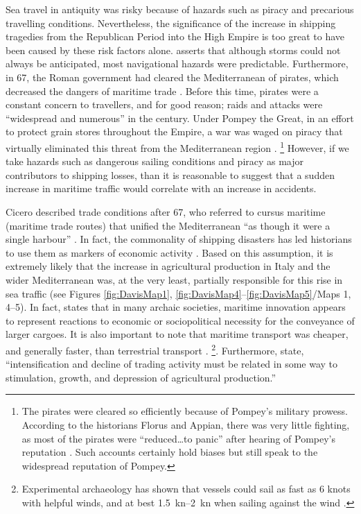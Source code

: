 Sea travel in antiquity was risky because of hazards such as piracy and precarious travelling conditions. 
Nevertheless, the significance of the increase in shipping tragedies from the Republican Period into the High Empire is too great to have been caused by these risk factors alone. \textcite[3304]{Leidwanger_2013} asserts that although storms could not always be anticipated, most navigational hazards were predictable. Furthermore, in 67\BC, the Roman government had cleared the Mediterranean of pirates, which decreased the dangers of maritime trade \parencites[313]{Kessler_2007}[287]{Wilson_2012}. Before this time, pirates were a constant concern to travellers, and for good reason; raids and attacks were “widespread and numerous” in the  century\BC \parencite[165]{Souza_1999}. 
Under Pompey the Great, in an effort to protect grain stores throughout the Empire, a war was waged on piracy that virtually eliminated this threat from the Mediterranean region \parencites[226]{Adams_2012}{Souza_1999}.
\footnote{The pirates were cleared so efficiently because of Pompey’s military prowess. According to the historians Florus and Appian, there was very little fighting, as most of the pirates were “reduced…to panic” after hearing of Pompey’s reputation \parencite[169]{Souza_1999}. 
Such accounts certainly hold biases but still speak to the widespread reputation of Pompey.}  However, if we take hazards such as dangerous sailing conditions and piracy as major contributors to shipping losses, than it is reasonable to suggest that a sudden increase in maritime traffic would correlate with an increase in accidents. 

Cicero described trade conditions after 67\BC, who referred to cursus maritime (maritime trade routes) that unified the Mediterranean “as though it were a single harbour” \parencite[255]{Adams_2012}.  In fact, the commonality of shipping disasters has led historians to use them as markers of economic activity \parencite[317]{Kessler_2007}. Based on this assumption, it is extremely likely that the increase in agricultural production in Italy and the wider Mediterranean was, at the very least, partially responsible for this rise in sea traffic (see Figures \ref{fig:DavisMap1}, \ref{fig:DavisMap4}--\ref{fig:DavisMap5}/Maps 1, 4--5). In fact, \textcite{Leidwanger_2014} states that in many archaic societies, maritime innovation appears to represent reactions to economic or sociopolitical necessity for the conveyance of larger cargoes. It is also important to note that maritime transport was cheaper, and generally faster, 
than terrestrial transport \parencite[222]{Adams_2012}.
\footnote{Experimental archaeology has shown that vessels could sail as fast as 6 knots with helpful winds, and at best \SIrange[range-phrase=--]{1.5}{2}{\knot} when sailing against the wind \parencite[3305]{Leidwanger_2013}.}. 
Furthermore, \textcite[7]{Bowman_2013} state, “intensification and decline of trading activity must be related in some way to stimulation, growth, and depression of agricultural production.”

